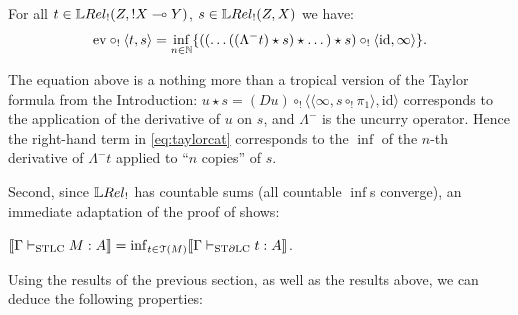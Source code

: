 \begin{theorem}\label{thm:modelsTaylor}
 For all $t\in\HOM{\LREL_!}{Z}{!X\multimap Y}$, $s\in\HOM{\LREL_!}{Z}{X}$ we have:%
 \begin{align}\label{eq:taylorcat}
  \mathrm{ev}\circ_!\langle t,s\rangle =
  \inf\limits_{n\in\mathbb{N}}
  \{((\dots((\Lambda^- t)\star s)\star \dots)\star s)\circ_! \langle \mathrm{id},\infty \rangle\}.
 \end{align} 
\end{theorem}
The equation above is a nothing more than a tropical version of the Taylor formula from the Introduction:
$u\star s= (Du)\circ_{!} \langle \langle  \infty, s\circ_{!} \pi_{1}\rangle,\mathrm{id}\rangle$ corresponds to the application of the derivative of $u$ on $s$, and $\Lambda^-$ is the uncurry operator.
Hence the right-hand term in \eqref{eq:taylorcat} corresponds to the $\inf$ of the $n$-th derivative of $\Lambda^{-}t$ applied to ``$n$ copies'' of $s$.


Second, since $\LREL_!$ has countable sums (all countable $\inf$s converge), an immediate adaptation of the proof of \cite[Theorem 4.23]{Manzo2012} shows:

\begin{corollary}\label{cor:T(M)=M}
$\llbracket\Gamma\vdash_{\mathrm{STLC}} M:A\rrbracket=\inf_{t\in\mathcal{T}(M)} \llbracket\Gamma\vdash_{\mathrm{ST}\partial\mathrm{LC}} t:A\rrbracket$. %
\end{corollary}




Using the results of the previous section, as well as the results above, we can deduce the following properties:

